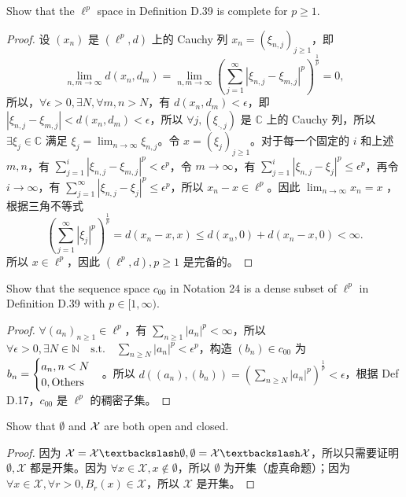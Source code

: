 \documentclass[lang=cn,a4paper,newtx,bibend=bibtex]{elegantpaper}
\begin{document}
\begin{prob}[D.40]
  Show that the $\ell^p$ space in Definition D.39
  is complete for $p\ge 1$.
\end{prob}

\begin{proof}
设 $(x_n)$ 是 $(\ell^p, d)$ 上的 Cauchy 列 \(x_n = (\xi_{n,j})_{j\geq 1}\)，即
\[\lim_{n,m\to \infty} d(x_n, d_m) = \lim_{n, m\to \infty} \left(\sum_{j=1}^{\infty} |\xi_{n, j} - \xi_{m, j}|^p\right)^{\frac1{p}} = 0,\]
所以，$\forall \epsilon > 0, \exists N, \forall m, n > N$，有 $d(x_n, d_m) < \epsilon$，即 $|\xi_{n, j} - \xi_{m, j}| < d(x_n, d_m) < \epsilon$，所以 $\forall j, (\xi_{\cdot, j})$ 是 $\mathbb{C}$ 上的 Cauchy 列，所以 $\exists \xi_j \in \mathbb{C}$ 满足 $\xi_j = \lim_{n\to \infty} \xi_{n, j}$。令 $x = (\xi_j)_{j\geq 1}$。对于每一个固定的 $i$ 和上述 $m,n$，有 $\sum_{j=1}^i |\xi_{n, j} - \xi_{m,j}|^p < \epsilon^p$，令 $m\to \infty$，有 $\sum_{j=1}^i |\xi_{n, j} - \xi_j|^p \leq \epsilon^p$，再令 $i\to \infty$，有 $\sum_{j=1}^{\infty} |\xi_{n,j} - \xi_j|^p \leq \epsilon^p$，所以 $x_n - x \in \ell^p$。因此 $\lim_{n\to\infty} x_n = x$ ，根据三角不等式
\[
\left(\sum_{j=1}^{\infty} |\xi_j|^p\right)^{\frac1{p}} = d(x_n - x, x) \leq d(x_n, 0) + d(x_n - x, 0) < \infty.
\]
所以 $x\in \ell^p$，因此 $(\ell^p, d), p\geq 1$ 是完备的。
\end{proof}

\begin{prob}[D.42]
  Show that the sequence space $c_{00}$
  in Notation 24
  is a dense subset of $\ell^p$
  in Definition D.39 with $p\in[1,\infty)$.
\end{prob}

\begin{proof}
$\forall (a_n)_{n\geq 1}\in \ell^p$，有 $\sum_{n\geq 1} |a_n|^p < \infty$，所以 $\forall \epsilon > 0, \exists N \in \mathbb{N}\quad \text{s.t.}\quad \sum_{n\geq N} |a_n|^p < \epsilon^p$，构造 $(b_n) \in c_{00}$ 为 $b_n = \begin{cases} a_n, n< N\\ 0, \text{Others} \end{cases}$。所以 $d((a_n), (b_n)) = \left(\sum_{n\geq N} |a_n|^p\right)^{\frac1{p}} < \epsilon$，根据 Def D.17，$c_{00}$ 是 $\ell^p$ 的稠密子集。
\end{proof}

\begin{prob}[D.49]
  Show that $\emptyset$ and ${\cal X}$
  are both open and closed.
\end{prob}

\begin{proof}
因为 $\mathcal{X} = \mathcal{X} \fxg \emptyset, \emptyset = \mathcal{X} \fxg \mathcal{X}$，所以只需要证明 $\emptyset, \mathcal{X}$  都是开集。因为 $\forall x \in \mathcal{X}, x\notin \emptyset$，所以 $\emptyset$ 为开集（虚真命题）；因为 $\forall x \in \mathcal{X}, \forall r > 0, B_r(x) \in \mathcal{X}$，所以 $\mathcal{X}$ 是开集。
\end{proof}
\end{document}
